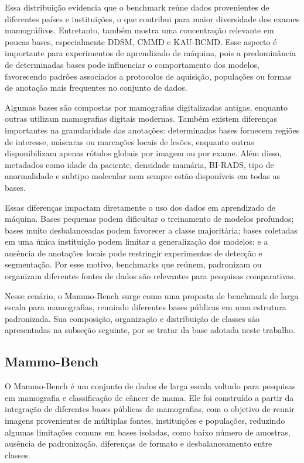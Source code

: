 \documentclass[
    12pt,
    openright,
    oneside,
    a4paper,
    english,
    brazil
]{abntex2}
\begin{document}
Essa distribuição evidencia que o benchmark reúne dados provenientes de diferentes países e instituições, o que contribui para maior diversidade dos exames mamográficos. Entretanto, também mostra uma concentração relevante em poucas bases, especialmente DDSM, CMMD e KAU-BCMD. Esse aspecto é importante para experimentos de aprendizado de máquina, pois a predominância de determinadas bases pode influenciar o comportamento dos modelos, favorecendo padrões associados a protocolos de aquisição, populações ou formas de anotação mais frequentes no conjunto de dados.

Algumas bases são compostas por mamografias digitalizadas antigas, enquanto outras utilizam mamografias digitais modernas. Também existem diferenças importantes na granularidade das anotações: determinadas bases fornecem regiões de interesse, máscaras ou marcações locais de lesões, enquanto outras disponibilizam apenas rótulos globais por imagem ou por exame. Além disso, metadados como idade da paciente, densidade mamária, BI-RADS, tipo de anormalidade e subtipo molecular nem sempre estão disponíveis em todas as bases.

Essas diferenças impactam diretamente o uso dos dados em aprendizado de máquina. Bases pequenas podem dificultar o treinamento de modelos profundos; bases muito desbalanceadas podem favorecer a classe majoritária; bases coletadas em uma única instituição podem limitar a generalização dos modelos; e a ausência de anotações locais pode restringir experimentos de detecção e segmentação. Por esse motivo, benchmarks que reúnem, padronizam ou organizam diferentes fontes de dados são relevantes para pesquisas comparativas.

Nesse cenário, o Mammo-Bench surge como uma proposta de benchmark de larga escala para mamografias, reunindo diferentes bases públicas em uma estrutura padronizada. Sua composição, organização e distribuição de classes são apresentadas na subseção seguinte, por se tratar da base adotada neste trabalho.

\subsection{Mammo-Bench}

O Mammo-Bench é um conjunto de dados de larga escala voltado para pesquisas em mamografia e classificação de câncer de mama. Ele foi construído a partir da integração de diferentes bases públicas de mamografias, com o objetivo de reunir imagens provenientes de múltiplas fontes, instituições e populações, reduzindo algumas limitações comuns em bases isoladas, como baixo número de amostras, ausência de padronização, diferenças de formato e desbalanceamento entre classes.
\end{document}
